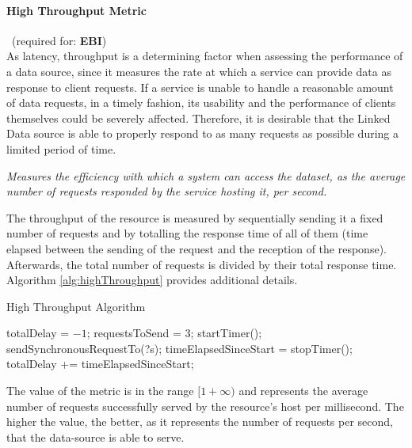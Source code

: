 
\paragraph{High Throughput Metric}~(required for: \textbf{EBI}) ~\\ %
As latency, throughput is a determining factor when assessing the performance of a data source, since it measures the rate at which a service can provide data as response to client requests. If a service is unable to handle a reasonable amount of data requests, in a timely fashion, its usability and the performance of clients themselves could be severely affected. Therefore, it is desirable that the Linked Data source is able to properly respond to as many requests as possible during a limited period of time.
\begin{mdframed}[style=metricdefinition]
\emph{Measures the efficiency with which a system can access the dataset, as the average number of requests responded by the service hosting it, per second.}
\end{mdframed}

The throughput of the resource is measured by sequentially sending it a fixed number of requests and by totalling the response time of all of them (time elapsed between the sending of the request and the reception of the response). Afterwards, the total number of requests is divided by their total response time. Algorithm \ref{alg:highThroughput} provides additional details.
\begin{algorithm}
\caption{High Throughput Algorithm} \label{alg:highThroughput}
\begin{algorithmic}[1]
\State totalDelay = $-1$;
\State requestsToSend = 3;
\EndProcedure
{}
\State startTimer();
\State sendSynchronousRequestTo(?s);
\EndFor
\State timeElapsedSinceStart = stopTimer();
\State totalDelay += timeElapsedSinceStart;
\EndIf
{}
\EndProcedure
\end{algorithmic}
\end{algorithm}
The value of the metric is in the range $[1 +\infty)$ and represents the average number of requests successfully served by the resource's host per millisecond. The higher the value, the better, as it represents the number of requests per second, that the data-source is able to serve.

